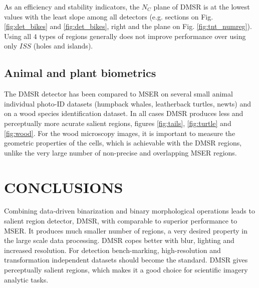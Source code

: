 \documentclass{article}
\begin{document}
As an efficiency and stability indicators, the $N_C$ plane of DMSR is at the lowest values with the least slope among all detectors (e.g. sections on Fig. \ref{fig:det_bikes} and \ref{fig:det_bikes}, right and the plane on Fig. \ref{fig:tnt_numreg}). Using all $4$ types of  regions generally does not improve performance over using only $ISS$ (holes and islands).

\subsection{Animal and plant biometrics}
\label{ssec:bio}
The DMSR detector has been compared to MSER on several small animal individual photo-ID datasets (humpback whales, leatherback turtles, newts) and on a wood species identification dataset. In all cases DMSR produces less and perceptually more acurate salient regions, figures \ref{fig:tails}, \ref{fig:turtle} and \ref{fig:wood}. For the wood microscopy images, it is important to measure the geometric properties of the cells, which is achievable with the DMSR regions, unlike the very large number of non-precise and overlapping MSER regions.

\section{CONCLUSIONS}
Combining data-driven binarization and binary morphological operations leads to salient region detector, DMSR, with comparable to superior performance to MSER. It produces much smaller number of regions, a very desired property in the large scale data processing. DMSR copes better with blur, lighting and increased resolution.  For detection bench-marking, high-resolution and transformation independent datasets should become the standard. DMSR gives perceptually salient regions, which makes it a good choice for scientific imagery analytic tasks.  
\label{sec:concl}










\end{document}
